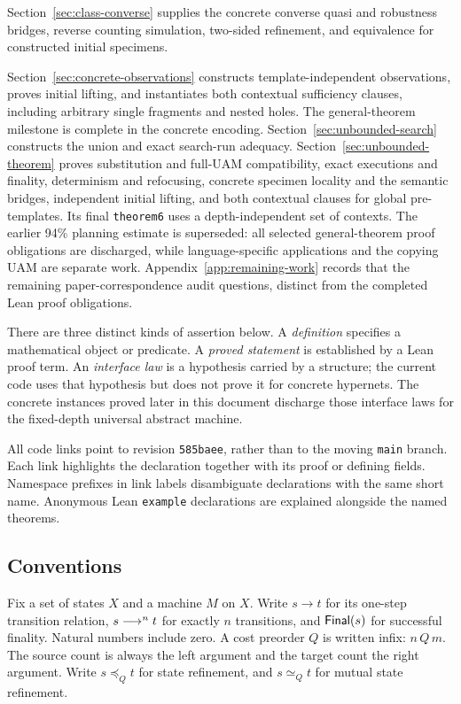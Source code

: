 Section~\ref{sec:class-converse} supplies the concrete converse quasi and robustness
bridges, reverse counting simulation, two-sided refinement, and equivalence
for constructed initial specimens.

Section~\ref{sec:concrete-observations} constructs template-independent
observations, proves initial lifting, and instantiates both contextual
sufficiency clauses, including arbitrary single fragments and nested holes.
The general-theorem milestone is complete in the concrete encoding.
Section~\ref{sec:unbounded-search} constructs the union and exact search-run
adequacy. Section~\ref{sec:unbounded-theorem} proves substitution and full-UAM
compatibility, exact executions and finality, determinism and refocusing,
concrete specimen locality and the semantic bridges, independent initial
lifting, and both contextual clauses for global pre-templates. Its final
\texttt{theorem6} uses a depth-independent set of contexts. The earlier
94\% planning estimate is superseded: all selected general-theorem proof
obligations are discharged, while language-specific applications and the
copying UAM are separate work. Appendix~\ref{app:remaining-work} records that
the remaining paper-correspondence audit questions, distinct from the completed Lean proof obligations.

There are three distinct kinds of assertion below. A \emph{definition} specifies
a mathematical object or predicate. A \emph{proved statement} is established by
a Lean proof term. An \emph{interface law} is a hypothesis carried by a
structure; the current code uses that hypothesis but does not prove it for
concrete hypernets. The concrete instances proved later in this document discharge those
interface laws for the fixed-depth universal abstract machine.

All code links point to revision \texttt{585baee}, rather than to the moving
\texttt{main} branch. Each link highlights the declaration together with its
proof or defining fields. Namespace prefixes in link labels disambiguate
declarations with the same short name. Anonymous Lean \texttt{example}
declarations are explained alongside the named theorems.

\subsection{Conventions}

Fix a set of states $X$ and a machine $M$ on $X$. Write $s\to t$ for its
one-step transition relation, $s\mathrel{\longrightarrow^{n}}t$ for exactly $n$ transitions, and
$\mathsf{Final}(s)$ for successful finality. Natural numbers include zero. A cost
preorder $Q$ is written infix: $n\,Q\,m$. The source count is always the
left argument and the target count the right argument. Write $s\preceq_Q t$
for state refinement, and $s\simeq_Q t$ for mutual state refinement.

